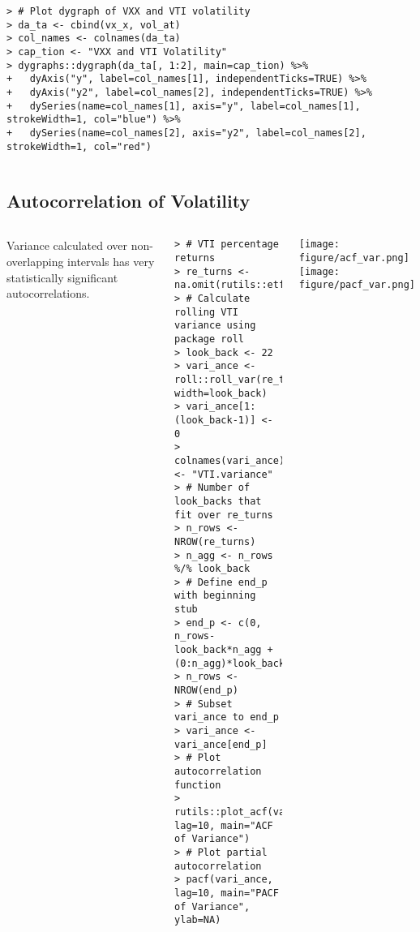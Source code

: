 \documentclass[10pt]{beamer}\usepackage[]{graphicx}\usepackage[]{color}
\makeatletter
\newenvironment{kframe}{%
 \def\at@end@of@kframe{}%
 \ifinner\ifhmode%
  \def\at@end@of@kframe{\end{minipage}}%
  \begin{minipage}{\columnwidth}%
 \fi\fi%
 \def\FrameCommand##1{\hskip\@totalleftmargin \hskip-\fboxsep
 \colorbox{shadecolor}{##1}\hskip-\fboxsep
     \hskip-\linewidth \hskip-\@totalleftmargin \hskip\columnwidth}%
 \MakeFramed {\advance\hsize-\width
   \@totalleftmargin\z@ \linewidth\hsize
   \@setminipage}}%
 {\par\unskip\endMakeFramed%
 \at@end@of@kframe}
\newenvironment{knitrout}{}{} %
\makeatother
\begin{document}
\begin{frame}[fragile,t]{\subsecname}
\begin{block}{}
\begin{columns}[T]
\begin{knitrout}
\begin{kframe}
\begin{verbatim}
> # Plot dygraph of VXX and VTI volatility
> da_ta <- cbind(vx_x, vol_at)
> col_names <- colnames(da_ta)
> cap_tion <- "VXX and VTI Volatility"
> dygraphs::dygraph(da_ta[, 1:2], main=cap_tion) %>%
+   dyAxis("y", label=col_names[1], independentTicks=TRUE) %>%
+   dyAxis("y2", label=col_names[2], independentTicks=TRUE) %>%
+   dySeries(name=col_names[1], axis="y", label=col_names[1], strokeWidth=1, col="blue") %>%
+   dySeries(name=col_names[2], axis="y2", label=col_names[2], strokeWidth=1, col="red")
\end{verbatim}
\end{kframe}
\end{knitrout}
  \end{columns}
\end{block}

\end{frame}


\subsection{Autocorrelation of Volatility}
\begin{frame}[fragile,t]{\subsecname}
\vspace{-1em}
\begin{block}{}
  \begin{columns}[T]
      Variance calculated over non-overlapping intervals has very statistically significant autocorrelations.
\begin{knitrout}\tiny
{}\color{fgcolor}\begin{kframe}
\begin{verbatim}
> # VTI percentage returns
> re_turns <- na.omit(rutils::etf_env$re_turns$VTI)
> # Calculate rolling VTI variance using package roll
> look_back <- 22
> vari_ance <- roll::roll_var(re_turns, width=look_back)
> vari_ance[1:(look_back-1)] <- 0
> colnames(vari_ance) <- "VTI.variance"
> # Number of look_backs that fit over re_turns
> n_rows <- NROW(re_turns)
> n_agg <- n_rows %/% look_back
> # Define end_p with beginning stub
> end_p <- c(0, n_rows-look_back*n_agg + (0:n_agg)*look_back)
> n_rows <- NROW(end_p)
> # Subset vari_ance to end_p
> vari_ance <- vari_ance[end_p]
> # Plot autocorrelation function
> rutils::plot_acf(vari_ance, lag=10, main="ACF of Variance")
> # Plot partial autocorrelation
> pacf(vari_ance, lag=10, main="PACF of Variance", ylab=NA)
\end{verbatim}
\end{kframe}
\end{knitrout}
      \vspace{-1em}
      \texttt{[image: figure/acf\_var.png]}\\
      \texttt{[image: figure/pacf\_var.png]}
  \end{columns}
\end{block}

\end{frame}
\end{document}
